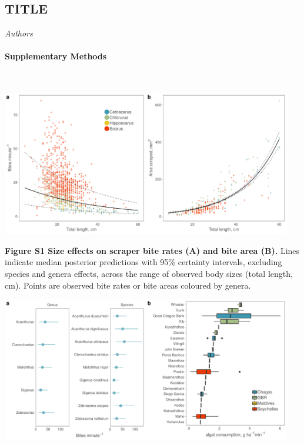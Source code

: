 \documentclass[12pt,]{article}
\title{}
\author{}
\date{}
\let\oldparagraph\paragraph
\renewcommand{\paragraph}[1]{\oldparagraph{#1}\mbox{}}
\begin{document}
\hypertarget{title}{%
\subsection{TITLE}\label{title}}

\emph{Authors}

\hypertarget{supplementary-methods}{%
\paragraph{Supplementary Methods}\label{supplementary-methods}}

~

\begin{center}\includegraphics[width=480px]{../../figures/FigureS1_scrape_size} \end{center}

\textbf{Figure S1 \textbar{} Size effects on scraper bite rates (A) and
bite area (B).} Lines indicate median posterior predictions with 95\%
certainty intervals, excluding species and genera effects, across the
range of observed body sizes (total length, cm). Points are observed
bite rates or bite areas coloured by genera.

\newpage

\begin{center}\includegraphics[width=480px]{../../figures/FigureS2_cropper_bites} \end{center}
\end{document}
